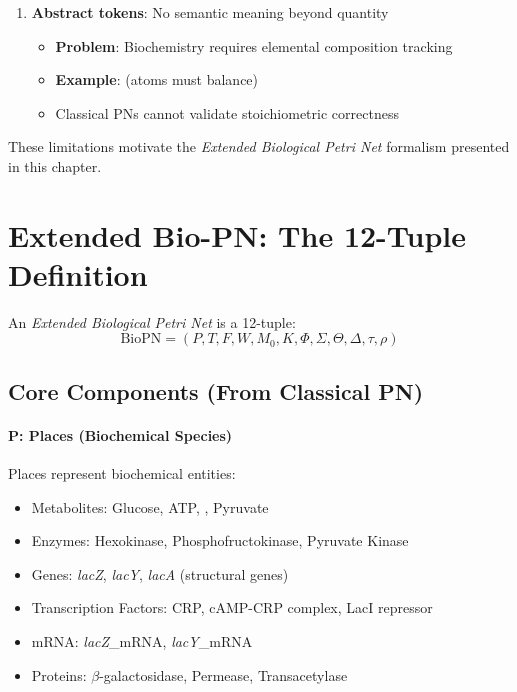 \begin{enumerate}
\item \textbf{Abstract tokens}: No semantic meaning beyond quantity
    \begin{itemize}
        \item \textbf{Problem}: Biochemistry requires elemental composition tracking
        \item \textbf{Example}:  (atoms must balance)
        \item Classical PNs cannot validate stoichiometric correctness
    \end{itemize}
\end{enumerate}

These limitations motivate the \emph{Extended Biological Petri Net} formalism presented in this chapter.

\section{Extended Bio-PN: The 12-Tuple Definition}
\label{sec:extended-biopn-12tuple}

An \emph{Extended Biological Petri Net} is a 12-tuple:
%
\begin{equation}
\text{BioPN} = (P, T, F, W, M_0, K, \Phi, \Sigma, \Theta, \Delta, \tau, \rho)
\end{equation}

\subsection{Core Components (From Classical PN)}
\label{subsec:core-components}

\paragraph{P: Places (Biochemical Species)}
Places represent biochemical entities:
\begin{itemize}
    \item Metabolites: Glucose, ATP, , Pyruvate
    \item Enzymes: Hexokinase, Phosphofructokinase, Pyruvate Kinase
    \item Genes: \textit{lacZ}, \textit{lacY}, \textit{lacA} (structural genes)
    \item Transcription Factors: CRP, cAMP-CRP complex, LacI repressor
    \item mRNA: \textit{lacZ}\_mRNA, \textit{lacY}\_mRNA
    \item Proteins: $\beta$-galactosidase, Permease, Transacetylase
\end{itemize}


